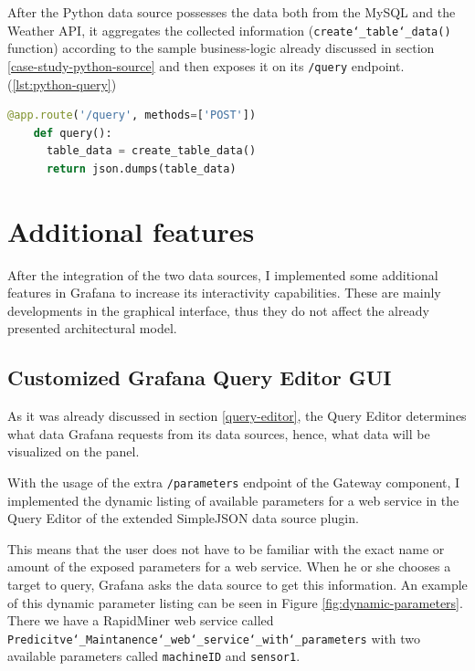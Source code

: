 After the Python data source possesses the data both from the MySQL and the Weather API, it aggregates the collected information (\texttt{create\char`_table\char`_data()} function) according to the sample business-logic already discussed in section \ref{case-study-python-source} and then exposes it on its \texttt{/query} endpoint. (\ref{lst:python-query})

\begin{minipage}[b]{\linewidth}
	\centering
	\begin{lstlisting}[language=Python, frame=single, mathescape,%
	caption={Exposing the prepared data}, label=lst:python-query]
	@app.route('/query', methods=['POST'])
	def query():
	  table_data = create_table_data()
	  return json.dumps(table_data)
	\end{lstlisting}
\end{minipage}

\section{Additional features}

After the integration of the two data sources, I implemented some additional features in Grafana to increase its interactivity capabilities. These are mainly developments in the graphical interface, thus they do not affect the already presented architectural model.

\subsection{Customized Grafana Query Editor GUI}

As it was already discussed in section \ref{query-editor}, the Query Editor determines what data Grafana requests from its data sources, hence, what data will be visualized on the panel. 

With the usage of the extra \texttt{/parameters} endpoint of the Gateway component, I implemented the dynamic listing of available parameters for a web service in the Query Editor of the extended SimpleJSON data source plugin.

This means that the user does not have to be familiar with the exact name or amount of the exposed parameters for a web service. When he or she chooses a target to query, Grafana asks the data source to get this information. An example of this dynamic parameter listing can be seen in Figure \ref{fig:dynamic-parameters}. There we have a RapidMiner web service called \texttt{Predicitve\char`_Maintanence\char`_web\char`_service\char`_with\char`_parameters} with two available parameters called \texttt{machineID} and \texttt{sensor1}.

